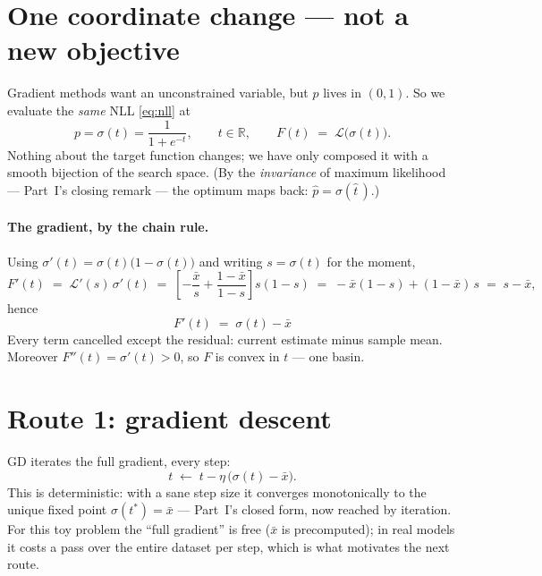 \documentclass[11pt]{article}
\newcommand{\sigmoid}{\sigma}
\newcommand{\xbar}{\bar{x}}
\begin{document}
\section{One coordinate change --- not a new objective}

Gradient methods want an unconstrained variable, but $p$ lives in
$(0,1)$. So we evaluate the \emph{same} NLL \eqref{eq:nll} at
\begin{equation}
  p = \sigmoid(t) = \frac{1}{1+e^{-t}}, \qquad t \in \mathbb{R},
  \qquad
  F(t) \;=\; \mathcal{L}\bigl(\sigmoid(t)\bigr).
  \label{eq:reparam}
\end{equation}
Nothing about the target function changes; we have only composed it with
a smooth bijection of the search space. (By the \emph{invariance} of
maximum likelihood --- Part~I's closing remark --- the optimum maps
back: $\hat p = \sigmoid(\hat t\,)$.)

\paragraph{The gradient, by the chain rule.}
Using $\sigmoid'(t) = \sigmoid(t)\bigl(1-\sigmoid(t)\bigr)$ and writing
$s = \sigmoid(t)$ for the moment,
\begin{equation*}
  F'(t)
  \;=\; \mathcal{L}'(s)\,\sigmoid'(t)
  \;=\; \left[-\frac{\xbar}{s} + \frac{1-\xbar}{1-s}\right] s(1-s)
  \;=\; -\xbar(1-s) + (1-\xbar)\,s
  \;=\; s - \xbar ,
\end{equation*}
hence
\begin{equation}
  \boxed{\;F'(t) \;=\; \sigmoid(t) - \xbar\;}
  \label{eq:grad}
\end{equation}
Every term cancelled except the residual: current estimate minus sample
mean. Moreover $F''(t) = \sigmoid'(t) > 0$, so $F$ is convex in $t$ ---
one basin.

\section{Route 1: gradient descent}

GD iterates the full gradient, every step:
\begin{equation}
  t \;\leftarrow\; t - \eta\,\bigl(\sigmoid(t) - \xbar\bigr).
  \label{eq:gd}
\end{equation}
This is deterministic: with a sane step size it converges monotonically
to the unique fixed point $\sigmoid(t^{\ast}) = \xbar$ --- Part~I's
closed form, now reached by iteration. For this toy problem the ``full
gradient'' is free ($\xbar$ is precomputed); in real models it costs a
pass over the entire dataset per step, which is what motivates the next
route.
\end{document}
